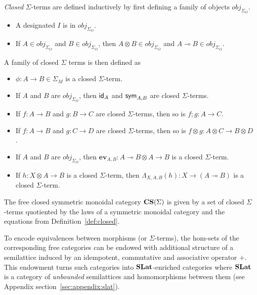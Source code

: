 \begin{definition}

\textit{Closed} $\Sigma$-terms are defined inductively by first defining a family of objects $obj_{\Sigma_{O}}$.
\begin{itemize}
\item A designated $I$ is in $obj_{\Sigma_{O}}$.
\item If $A \in obj_{\Sigma_{O}}$ and $B \in obj_{\Sigma_{O}}$, then $A \otimes B \in obj_{\Sigma_{O}}$ and $A \multimap B \in obj_{\Sigma_{O}}$.
\end{itemize}
A family of closed $\Sigma$ terms is then defined as
\begin{itemize}
    \item $\phi : A \to B \in \Sigma_{M}$ is a closed $\Sigma$-term.
    \item If $A$ and $B$ are $obj_{\Sigma_{O}}$, then $\textsf{id}_{A}$ and $\textsf{sym}_{A,B}$ are closed $\Sigma$-terms.
    \item If $f : A \to B$ and $g : B \to C$ are closed $\Sigma$-terms, then so is $f;g : A \to C$. 
    \item If $f : A \to B$ and $g : C \to D$ are closed $\Sigma$-terms, then so is $f \otimes g : A \otimes C \to B \otimes D$.
    \item If $A$ and $B$ are $obj_{\Sigma_{O}}$, then $\textbf{ev}_{A,B} : A \multimap B \otimes A \to B$ is a closed $\Sigma$-term.
    \item If $h : X \otimes A \to B$ is a closed $\Sigma$-term, then $\Lambda_{X,A,B}(h) : X \to (A \multimap B)$ is a closed $\Sigma$-term.
\end{itemize}
\end{definition}

\begin{definition}
The free closed symmetric monoidal category $\mathbf{CS}(\Sigma)$ is given by a set of closed $\Sigma$-terms quotiented by the laws of a symmetric monoidal category and the equations from Definition~\ref{def:closed}.
\end{definition}

To encode equivalences between morphisms (or $\Sigma$-terms), the hom-sets of the corresponding free categories can be endowed with additional structure of a semilattice induced by an idempotent, commutative and associative operator $+$.
This endowment turns such categories into $\mathbf{SLat}$-enriched categories where $\mathbf{SLat}$ is a category of \textit{unbounded} semilattices and homomorphisms between them (see Appendix section~\ref{sec:appendix:slat}).

